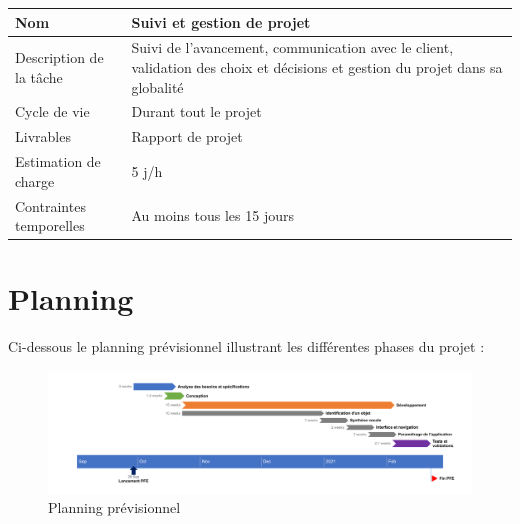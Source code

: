 \documentclass[CDS,UTF8,final]{EPURapport}
\begin{document}
\begin{table}[h!]
\centering
\begin{tabular}{|p{4cm}|p{10cm}|}
\hline
Nom                     & Suivi et gestion de projet                                                                                                    \\ \hline
Description de la tâche & Suivi de l'avancement, communication avec le client, validation des choix et décisions et gestion du projet dans sa globalité \\ \hline
Cycle de vie            & Durant tout le projet                                                                                                         \\ \hline
Livrables               & Rapport de projet                                                                                                             \\ \hline
Estimation de charge    & 5 j/h                                                                                                                         \\ \hline
Contraintes temporelles & Au moins tous les 15 jours                                                                                                    \\ \hline
\end{tabular}
\end{table}
\par

\newpage

\section{Planning}

Ci-dessous le planning prévisionnel illustrant les différentes phases du projet :

\begin{figure}[h!]
\centering
  \includegraphics[width=\linewidth]{images/PlanningPrev.png}
  \caption{Planning prévisionnel}
  \label{fig:planningprev}
\end{figure}
\end{document}

